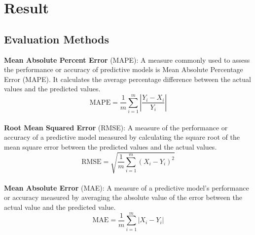 \documentclass{ieeeojies}
\begin{document}
\section{Result}
\subsection{Evaluation Methods}
\textbf{Mean Absolute Percent Error} (MAPE): A measure commonly used to assess the performance or accuracy of predictive models is Mean Absolute Percentage Error (MAPE). It calculates the average percentage difference between the actual values and the predicted values.\\
\[
\text{MAPE} = \frac{1}{m} \sum_{i=1}^{m} \left| \frac{Y_i - X_i}{Y_i} \right|
\]\\
\textbf{Root Mean Squared Error} (RMSE): A measure of the performance or accuracy of a predictive model measured by calculating the square root of the mean square error between the predicted values and the actual values.\\
\[
\text{RMSE} = \sqrt{\frac{1}{m} \sum_{i=1}^{m} (X_i - Y_i)^2}
\]
\\
\textbf{Mean Absolute Error} (MAE): A measure of a predictive model's performance or accuracy measured by averaging the absolute value of the error between the actual value and the predicted value.\\
\[
\text{MAE} = \frac{1}{m} \sum_{i=1}^{m} |X_i - Y_i|
\]
\end{document}
